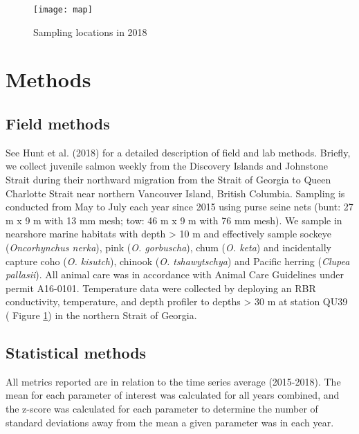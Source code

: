 \documentclass[fleqn,10pt]{wlpeerj} %
\begin{document}
\begin{figure}

\texttt{[image: map]} \hfill{}

\caption{Sampling locations in 2018}\label{fig:map}
\end{figure}

\section*{Methods}\label{methods}

\subsection*{Field methods}\label{field-methods}

See Hunt et al. (2018) for a detailed description of field and lab
methods. Briefly, we collect juvenile salmon weekly from the Discovery
Islands and Johnstone Strait during their northward migration from the
Strait of Georgia to Queen Charlotte Strait near northern Vancouver
Island, British Columbia. Sampling is conducted from May to July each
year since 2015 using purse seine nets (bunt: 27 m x 9 m with 13 mm
mesh; tow: 46 m x 9 m with 76 mm mesh). We sample in nearshore marine
habitats with depth \textgreater{} 10 m and effectively sample sockeye
(\emph{Oncorhynchus nerka}), pink (\emph{O. gorbuscha}), chum (\emph{O.
keta}) and incidentally capture coho (\emph{O. kisutch}), chinook
(\emph{O. tshawytschya}) and Pacific herring (\emph{Clupea pallasii}).
All animal care was in accordance with Animal Care Guidelines under
permit A16-0101. Temperature data were collected by deploying an RBR
conductivity, temperature, and depth profiler to depths \textgreater{}
30 m at station QU39 ( Figure \ref{fig:map}) in the northern Strait of
Georgia.

\subsection*{Statistical methods}\label{statistical-methods}

All metrics reported are in relation to the time series average
(2015-2018). The mean for each parameter of interest was calculated for
all years combined, and the z-score was calculated for each parameter to
determine the number of standard deviations away from the mean a given
parameter was in each year.
\end{document}
